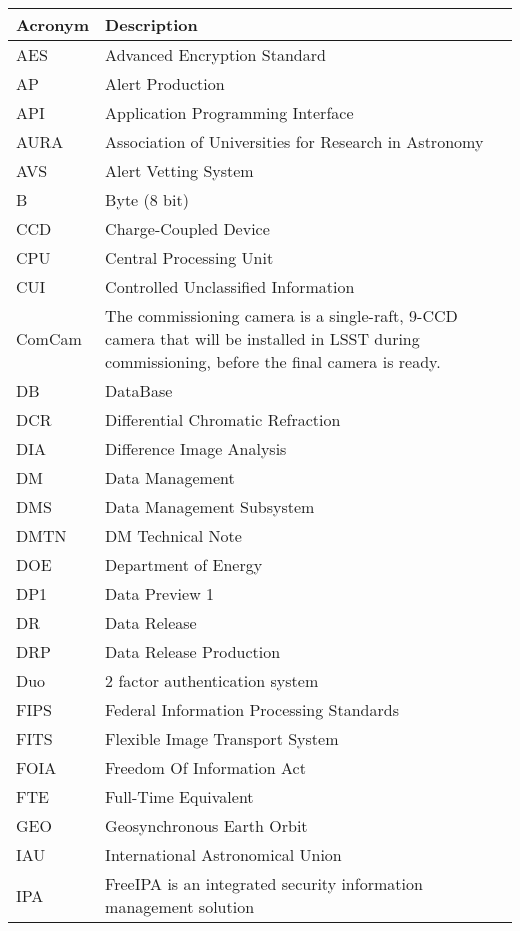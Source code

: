 \addtocounter{table}{-1}
\begin{longtable}{p{}p{}}\hline
\textbf{Acronym} & \textbf{Description}  \\\hline

AES & Advanced Encryption Standard \\\hline
AP & Alert Production \\\hline
API & Application Programming Interface \\\hline
AURA & Association of Universities for Research in Astronomy \\\hline
AVS & Alert Vetting System \\\hline
B & Byte (8 bit) \\\hline
CCD & Charge-Coupled Device \\\hline
CPU & Central Processing Unit \\\hline
CUI & Controlled Unclassified Information \\\hline
ComCam & The commissioning camera is a single-raft, 9-CCD camera that will be installed in LSST during commissioning, before the final camera is ready. \\\hline
DB & DataBase \\\hline
DCR & Differential Chromatic Refraction \\\hline
DIA & Difference Image Analysis \\\hline
DM & Data Management \\\hline
DMS & Data Management Subsystem \\\hline
DMTN & DM Technical Note \\\hline
DOE & Department of Energy \\\hline
DP1 & Data Preview 1 \\\hline
DR & Data Release \\\hline
DRP & Data Release Production \\\hline
Duo & 2 factor authentication system \\\hline
FIPS & Federal Information Processing Standards \\\hline
FITS & Flexible Image Transport System \\\hline
FOIA & Freedom Of Information Act \\\hline
FTE & Full-Time Equivalent \\\hline
GEO & Geosynchronous Earth Orbit  \\\hline
IAU & International Astronomical Union \\\hline
IPA & FreeIPA is an integrated security information management solution \\\hline

\end{longtable}
